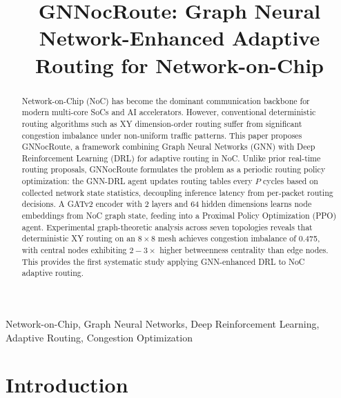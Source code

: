 \documentclass[conference]{IEEEtran}
\begin{document}
\title{GNNocRoute: Graph Neural Network-Enhanced Adaptive Routing for Network-on-Chip}

\author{
}

\maketitle

\begin{abstract}
Network-on-Chip (NoC) has become the dominant communication backbone for modern multi-core SoCs and AI accelerators. However, conventional deterministic routing algorithms such as XY dimension-order routing suffer from significant congestion imbalance under non-uniform traffic patterns. This paper proposes GNNocRoute, a framework combining Graph Neural Networks (GNN) with Deep Reinforcement Learning (DRL) for adaptive routing in NoC. Unlike prior real-time routing proposals, GNNocRoute formulates the problem as a periodic routing policy optimization: the GNN-DRL agent updates routing tables every $P$ cycles based on collected network state statistics, decoupling inference latency from per-packet routing decisions. A GATv2 encoder with 2 layers and 64 hidden dimensions learns node embeddings from NoC graph state, feeding into a Proximal Policy Optimization (PPO) agent. Experimental graph-theoretic analysis across seven topologies reveals that deterministic XY routing on an $8\times8$ mesh achieves congestion imbalance of 0.475, with central nodes exhibiting $2-3\times$ higher betweenness centrality than edge nodes. This provides the first systematic study applying GNN-enhanced DRL to NoC adaptive routing.
\end{abstract}

\begin{IEEEkeywords}
Network-on-Chip, Graph Neural Networks, Deep Reinforcement Learning, Adaptive Routing, Congestion Optimization
\end{IEEEkeywords}

\section{Introduction}
\label{sec:intro}
\end{document}
